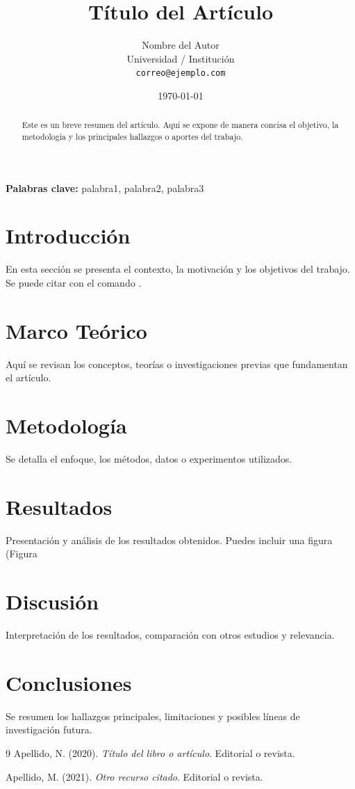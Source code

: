 \documentclass[12pt,a4paper]{article}
\title{Título del Artículo}
\author{Nombre del Autor \\[0.5em]
	\small Universidad / Institución \\
	\small \texttt{correo@ejemplo.com}}
\date{\today}
\begin{document}
	
	\maketitle
	
	\begin{abstract}
		Este es un breve resumen del artículo. Aquí se expone de manera concisa el objetivo, la metodología y los principales hallazgos o aportes del trabajo.
	\end{abstract}
	
	\textbf{Palabras clave:} palabra1, palabra2, palabra3
	
	\section{Introducción}
	En esta sección se presenta el contexto, la motivación y los objetivos del trabajo.  
	Se puede citar con el comando \cite{autor2020}.
	
	\section{Marco Teórico}
	Aquí se revisan los conceptos, teorías o investigaciones previas que fundamentan el artículo.
	
	\section{Metodología}
	Se detalla el enfoque, los métodos, datos o experimentos utilizados.
	
	\section{Resultados}
	Presentación y análisis de los resultados obtenidos.  
	Puedes incluir una figura (Figura %
	

	
	\section{Discusión}
	Interpretación de los resultados, comparación con otros estudios y relevancia.
	
	\section{Conclusiones}
	Se resumen los hallazgos principales, limitaciones y posibles líneas de investigación futura.
	
	\begin{thebibliography}{9}
		Apellido, N. (2020). \textit{Título del libro o artículo}. Editorial o revista.
		
		Apellido, M. (2021). \textit{Otro recurso citado}. Editorial o revista.
	\end{thebibliography}
	
\end{document}
